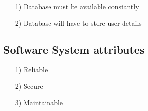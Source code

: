 \documentclass[10pt,a4paper]{article}
\begin{document}
\begin{itemize}

\item[1)]
Database must be available constantly

\item[2)]
Database will have to store user details

\end{itemize}



\subsection{Software System attributes}

\begin{itemize}
\item[1)]
Reliable
\item[2)]
Secure
\item[3)]
Maintainable
\end{itemize}
\end{document}
